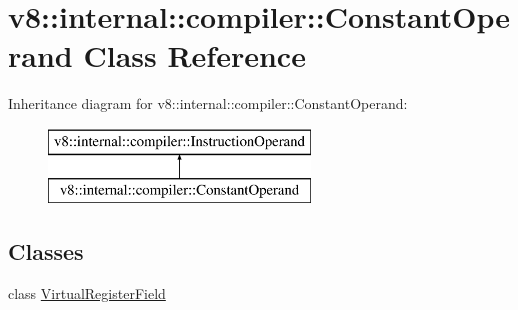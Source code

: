 \hypertarget{classv8_1_1internal_1_1compiler_1_1_constant_operand}{}\section{v8\+:\+:internal\+:\+:compiler\+:\+:Constant\+Operand Class Reference}
\label{classv8_1_1internal_1_1compiler_1_1_constant_operand}
Inheritance diagram for v8\+:\+:internal\+:\+:compiler\+:\+:Constant\+Operand\+:\begin{figure}[H]
\begin{center}
\leavevmode
\includegraphics[height=2.000000cm]{classv8_1_1internal_1_1compiler_1_1_constant_operand}
\end{center}
\end{figure}
\subsection*{Classes}
\begin{DoxyCompactItemize}
\item 
class \hyperlink{classv8_1_1internal_1_1compiler_1_1_constant_operand_1_1_virtual_register_field}{Virtual\+Register\+Field}
\end{DoxyCompactItemize}
